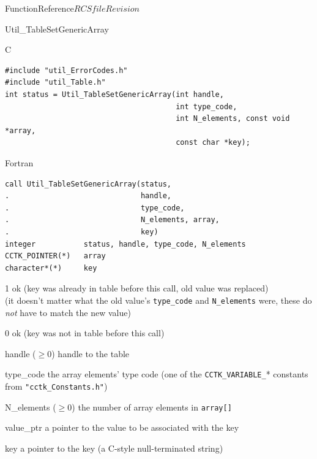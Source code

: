 \begin{cactuspart}{FunctionReference}{$RCSfile$}{$Revision$}
\begin{FunctionDescription}{Util\_TableSetGenericArray}
\begin{SynopsisSection}
\begin{Synopsis}{C}
\begin{verbatim}
#include "util_ErrorCodes.h"
#include "util_Table.h"
int status = Util_TableSetGenericArray(int handle,
                                       int type_code,
                                       int N_elements, const void *array,
                                       const char *key);
\end{verbatim}
\end{Synopsis}
\begin{Synopsis}{Fortran}
\begin{verbatim}
call Util_TableSetGenericArray(status,
.                              handle,
.                              type_code,
.                              N_elements, array,
.                              key)
integer           status, handle, type_code, N_elements
CCTK_POINTER(*)   array
character*(*)     key
\end{verbatim}
\end{Synopsis}
\end{SynopsisSection}

\begin{ResultSection}
\begin{Result}{\rm 1}
ok (key was already in table before this call, old value was replaced)\\
   (it doesn't matter what the old value's \verb|type_code| and
    \verb|N_elements| were, \ie{} these do {\em not\/} have to match
    the new value)
\end{Result}
\begin{Result}{\rm 0}
ok (key was not in table before this call)
\end{Result}
\end{ResultSection}

\begin{ParameterSection}
\begin{Parameter}{handle ($\ge 0$)}
handle to the table
\end{Parameter}
\begin{Parameter}{type\_code}
the array elements' type code
(one of the \verb|CCTK_VARIABLE_|* constants from \verb|"cctk_Constants.h"|)
\end{Parameter}
\begin{Parameter}{N\_elements ($\ge 0$)}
the number of array elements in \verb|array[]|
\end{Parameter}
\begin{Parameter}{value\_ptr}
a pointer to the value to be associated with the key
\end{Parameter}
\begin{Parameter}{key}
a pointer to the key (a C-style null-terminated string)
\end{Parameter}
\end{ParameterSection}


\end{FunctionDescription}
\end{cactuspart}
